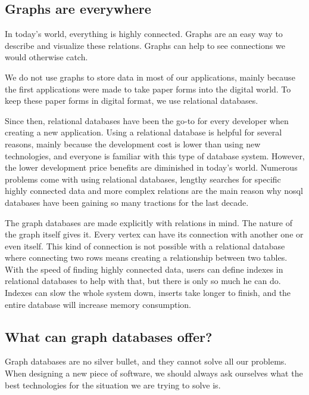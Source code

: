 \begin{introduction}

    \section{Graphs are everywhere}

    In today's world, everything is highly connected. Graphs are an easy way to describe and visualize these relations. Graphs can help to see connections we would otherwise catch.

    We do not use graphs to store data in most of our applications, mainly because the first applications were made to take paper forms into the digital world. To keep these paper forms in digital format, we use relational databases.

    Since then, relational databases have been the go-to for every developer when creating a new application. Using a relational database is helpful for several reasons, mainly because the development cost is lower than using new technologies, and everyone is familiar with this type of database system. However, the lower development price benefits are diminished in today's world. Numerous problems come with using relational databases,
    lengthy searches for specific highly connected data and more complex relations are the main reason why \Gls{nosql} databases have been gaining so many tractions for the last decade.

    The graph databases are made explicitly with relations in mind. The nature of the graph itself gives it. Every vertex can have its connection with another one or even itself. This kind of connection is not possible with a relational database where connecting two rows means creating a relationship between two tables. With the speed of finding highly connected data, users can define indexes in relational databases to help with that, but there is only so much he can do. Indexes can slow the whole system down, inserts take longer to finish, and the entire database will increase memory consumption.

    \subsection{What can graph databases offer?}

    Graph databases are no silver bullet, and they cannot solve all our problems. When designing a new piece of software, we should always ask ourselves what the best technologies for the situation we are trying to solve is.


\end{introduction}
